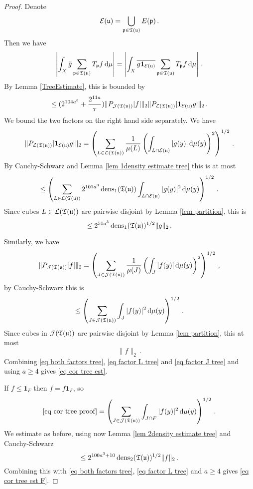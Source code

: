 \begin{proof}
    Denote
    $$
        \mathcal{E}(\mathfrak u) = \bigcup_{\mathfrak p \in \mathfrak T(\mathfrak u)} E(\mathfrak p)\,.
    $$
    Then we have
    $$
        \left| \int_X \bar g \sum_{\mathfrak p \in \mathfrak T(\mathfrak u)} T_{\mathfrak p} f \, \mathrm{d}\mu \right|  = \left| \int_X \overline{ g\mathbf{1}_{\mathcal{E}(\mathfrak u)}}  \sum_{\mathfrak p \in \mathfrak T(\mathfrak u)} T_{\mathfrak p} f \, \mathrm{d}\mu \right|\,.
    $$
    By Lemma \ref{TreeEstimate}, this is bounded by
    \begin{equation}
        \label{eq both factors tree}
        \le (2^{104a^3} + \frac{2^{11a}}{\tau})\|P_{\mathcal{J}(\mathfrak T(\mathfrak u))}|f|\|_2 \|P_{\mathcal{L}(\mathfrak T(\mathfrak u))} |\mathbf{1}_{\mathcal{E}(\mathfrak u)}g|\|_2\,.
    \end{equation}
    We bound the two factors on the right hand side separately.
    We have
    $$
        \|P_{\mathcal{L}(\mathfrak T(\mathfrak u))} |\mathbf{1}_{\mathcal{E}(\mathfrak u)}g|\|_2 = \left( \sum_{L \in \mathcal{L}(\mathfrak T(\mathfrak u))} \frac{1}{\mu(L)} \left(\int_{L \cap \mathcal{E}(\mathfrak u)} |g(y)| \, \mathrm{d}\mu(y)\right)^2 \right)^{1/2}\,.
    $$
    By Cauchy-Schwarz and Lemma \ref{lem 1density estimate tree} this is at most
    $$
        \le \left( \sum_{L \in \mathcal{L}(\mathfrak T(\mathfrak u))} 2^{101a^3} \operatorname{\operatorname{dens}}_1(\mathfrak T(\mathfrak u)) \int_{L \cap \mathcal{E}(\mathfrak u)} |g(y)|^2 \, \mathrm{d}\mu(y) \right)^{1/2}\,.
    $$
    Since cubes $L \in \mathcal{L}(\mathfrak T(\mathfrak u))$ are pairwise disjoint by Lemma \ref{lem partition}, this is
    \begin{equation}
        \label{eq factor L tree}
            \le 2^{51 a^3} \operatorname{\operatorname{dens}}_1(\mathfrak T(\mathfrak u))^{1/2} \|g\|_2\,.
    \end{equation}

    Similarly, we have
    \begin{equation}
        \label{eq cor tree proof}
        \|P_{\mathcal{J}(\mathfrak T(\mathfrak u))}|f|\|_2  = \left( \sum_{J \in \mathcal{J}(\mathfrak T(\mathfrak u))} \frac{1}{\mu(J)} \left(\int_J |f(y)| \, \mathrm{d}\mu(y)\right)^2 \right)^{1/2}\,,
    \end{equation}
    by Cauchy-Schwarz this is
    $$
        \le \left( \sum_{J \in \mathcal{J}(\mathfrak T(\mathfrak u))} \int_J |f(y)|^2 \, \mathrm{d}\mu(y) \right)^{1/2}\,.
    $$
    Since cubes in $\mathcal{J}(\mathfrak T(\mathfrak u))$ are pairwise disjoint by Lemma \ref{lem partition}, this at most
    \begin{equation}
        \label{eq factor J tree}
        \|f\|_2\,.
    \end{equation}
    Combining \eqref{eq both factors tree}, \eqref{eq factor L tree} and \eqref{eq factor J tree} and using $a \ge 4$ gives \eqref{eq cor tree est}.

    If $f \le \mathbf{1}_F$ then $f = f\mathbf{1}_F$, so
    $$
        \eqref{eq cor tree proof} = \left( \sum_{J \in \mathcal{J}(\mathfrak T(\mathfrak u))} \int_{J \cap F} |f(y)|^2 \, \mathrm{d}\mu(y) \right)^{1/2}\,.
    $$
    We estimate as before, using now Lemma \ref{lem 2density estimate tree} and Cauchy-Schwarz
    $$
        \le 2^{100a^3 + 10} \operatorname{\operatorname{dens}}_2(\mathfrak T(\mathfrak u))^{1/2} \|f\|_2\,.
    $$
    Combining this with \eqref{eq both factors tree}, \eqref{eq factor L tree} and $a \ge 4$ gives \eqref{eq cor tree est F}.
\end{proof}

